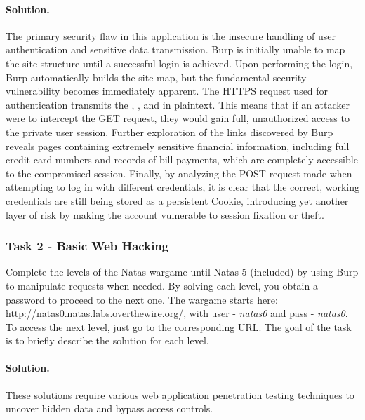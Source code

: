 \paragraph{Solution.} The primary security flaw in this application is the insecure handling of user authentication and sensitive data transmission. Burp is initially unable to map the site structure until a successful login is achieved. Upon performing the login, Burp automatically builds the site map, but the fundamental security vulnerability becomes immediately apparent. The HTTPS request used for authentication transmits the , , and  in plaintext. This means that if an attacker were to intercept the GET request, they would gain full, unauthorized access to the private user session. Further exploration of the links discovered by Burp reveals pages containing extremely sensitive financial information, including full credit card numbers and records of bill payments, which are completely accessible to the compromised session. Finally, by analyzing the POST request made when attempting to log in with different credentials, it is clear that the correct, working credentials are still being stored as a persistent Cookie, introducing yet another layer of risk by making the account vulnerable to session fixation or theft.

\subsubsection{Task 2 - Basic Web Hacking}
Complete the levels of the Natas wargame until Natas 5 (included) by using Burp to manipulate requests when needed. By solving each level, you obtain a password to proceed to the next one. The wargame starts here: \url{http://natas0.natas.labs.overthewire.org/}, with user - \emph{natas0} and pass - \emph{natas0}. To access the next level, just go to the corresponding URL\@. The goal of the task is to briefly describe the solution for each level.

\paragraph{Solution.} These solutions require various web application penetration testing techniques to uncover hidden data and bypass access controls.

